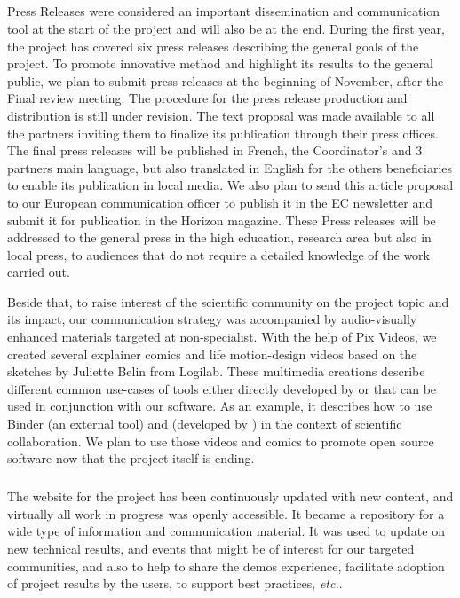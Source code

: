\subparagraph{}
\label{dissem@dissemination-communication}

 Press Releases were considered an important dissemination and communication tool at the start of the project and will also be at the end. During the  first year, the project has covered six press releases describing the general goals of the project. To promote \ODK innovative method and highlight its results to the general public, we plan to submit press releases at the beginning of November, after the Final review meeting. The procedure for the press release production and distribution is still under revision. The text proposal was made available to all the partners  inviting them to finalize its publication through their press offices. The final press releases will be published in French, the Coordinator’s and 3 partners main language, but also translated in English for the others beneficiaries to enable its publication in local media. We also plan to send this article proposal to our European communication officer to publish it in the EC newsletter and submit it for publication in the Horizon magazine.  These Press releases will  be  addressed  to   the general press in the high education, research area but also in local press, to audiences that do not require a detailed knowledge of the work carried out.
 
 Beside that, to raise interest of the scientific community on the project topic and its impact, our communication strategy was accompanied by audio-visually enhanced materials targeted at non-specialist. With the help of Pix Videos, we created several explainer comics and life motion-design videos based on the sketches by Juliette Belin from Logilab. These multimedia creations describe different common use-cases of tools either directly developed by \ODK or that can be used in conjunction with our software. As an example, it describes how to use Binder (an external tool) and \Jupyter (developed by \ODK) in the context of scientific collaboration. We plan to use those videos and comics to promote open source software now that the project itself is ending.



\subparagraph{}


The website for the project has been continuously updated with new content, and virtually all work in progress was openly accessible. It  became  a  repository  for  a  wide  type  of information and communication material. It was used to update on new technical results, and events that might be of interest for our targeted communities, and also to help to share the demos experience, facilitate adoption of project results by the users, to support best practices, \emph{etc.}.

